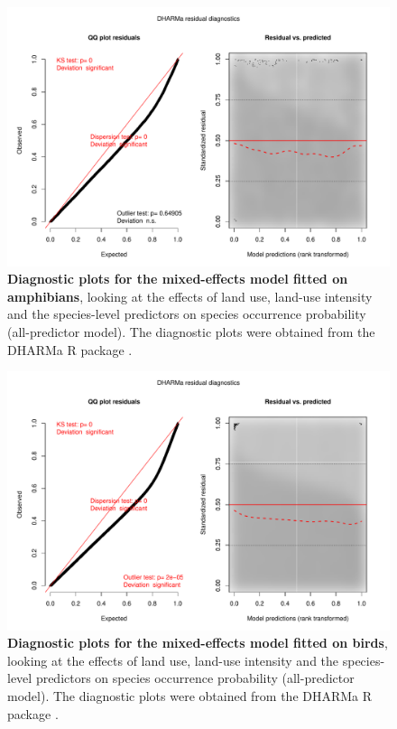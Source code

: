 \documentclass[11pt]{article}
\begin{document}
\begin{figure}[h!]
\centering
\includegraphics[scale=0.5]{Figures/LU_Diag_amphibians}
\caption[]{\textbf{Diagnostic plots for the mixed-effects model fitted on amphibians}, looking at the effects of land use, land-use intensity and the species-level predictors on species occurrence probability (all-predictor model). The diagnostic plots were obtained from the DHARMa R package \citep{DHARMa}.}
\label{}
\end{figure}

\begin{figure}[h!]
\centering
\includegraphics[scale=0.5]{Figures/LU_Diag_birds}
\caption[]{\textbf{Diagnostic plots for the mixed-effects model fitted on birds}, looking at the effects of land use, land-use intensity and the species-level predictors on species occurrence probability (all-predictor model). The diagnostic plots were obtained from the DHARMa R package \citep{DHARMa}.}
\label{}
\end{figure}
\end{document}
